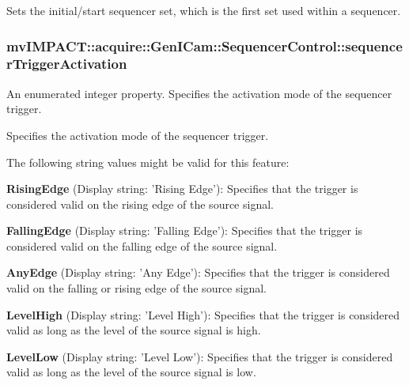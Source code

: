 Sets the initial/start sequencer set, which is the first set used within a sequencer. \hypertarget{classmv_i_m_p_a_c_t_1_1acquire_1_1_gen_i_cam_1_1_sequencer_control_abf216c266c3d02126daa2d09fc1fe161}{
\subsubsection[{sequencer\+Trigger\+Activation}]{ mv\+I\+M\+P\+A\+C\+T\+::acquire\+::\+Gen\+I\+Cam\+::\+Sequencer\+Control\+::sequencer\+Trigger\+Activation}}\label{classmv_i_m_p_a_c_t_1_1acquire_1_1_gen_i_cam_1_1_sequencer_control_abf216c266c3d02126daa2d09fc1fe161}


An enumerated integer property. Specifies the activation mode of the sequencer trigger. 

Specifies the activation mode of the sequencer trigger.

The following string values might be valid for this feature\+:
\begin{DoxyItemize}
\item {\bfseries Rising\+Edge} (Display string\+: 'Rising Edge')\+: Specifies that the trigger is considered valid on the rising edge of the source signal.
\item {\bfseries Falling\+Edge} (Display string\+: 'Falling Edge')\+: Specifies that the trigger is considered valid on the falling edge of the source signal.
\item {\bfseries Any\+Edge} (Display string\+: 'Any Edge')\+: Specifies that the trigger is considered valid on the falling or rising edge of the source signal.
\item {\bfseries Level\+High} (Display string\+: 'Level High')\+: Specifies that the trigger is considered valid as long as the level of the source signal is high.
\item {\bfseries Level\+Low} (Display string\+: 'Level Low')\+: Specifies that the trigger is considered valid as long as the level of the source signal is low.
\end{DoxyItemize}

